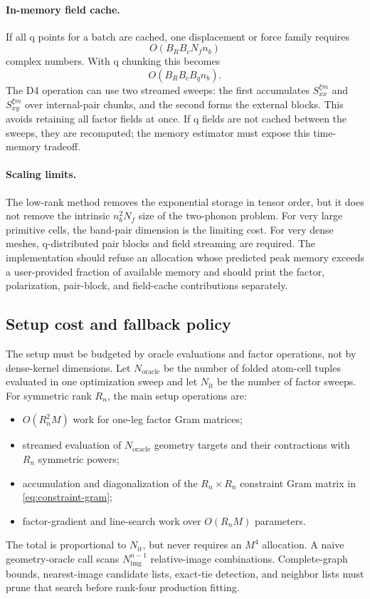 \documentclass{article}
\newcommand{\Nf}{N_f}
\begin{document}
\paragraph{In-memory field cache.}
If all q points for a batch are cached, one displacement or force family
requires
\begin{equation}
    O(B_RB_c\Nf n_b)
    \label{eq:full-field-cache}
\end{equation}
complex numbers. With q chunking this becomes
\begin{equation}
    O(B_RB_cB_qn_b).
    \label{eq:chunked-field-cache}
\end{equation}
The D4 operation can use two streamed sweeps: the first accumulates
$S_{xx}^{\xi m}$ and $S_{xy}^{\xi m}$ over internal-pair chunks, and the
second forms the external blocks. This avoids retaining all factor fields
at once. If q fields are not cached between the sweeps, they are recomputed;
the memory estimator must expose this time-memory tradeoff.

\paragraph{Scaling limits.}
The low-rank method removes the exponential storage in tensor order, but it
does not remove the intrinsic $n_b^2\Nf$ size of the two-phonon problem.
For very large primitive cells, the band-pair dimension is the limiting
cost. For very dense meshes, q-distributed pair blocks and field streaming
are required. The implementation should refuse an allocation whose
predicted peak memory exceeds a user-provided fraction of available memory
and should print the factor, polarization, pair-block, and field-cache
contributions separately.
\subsection{Setup cost and fallback policy}
\label{sec:setup-cost}

The setup must be budgeted by oracle evaluations and factor operations, not
by dense-kernel dimensions. Let $N_{\mathrm{oracle}}$ be the number of
folded atom-cell tuples evaluated in one optimization sweep and let
$N_{\mathrm{it}}$ be the number of factor sweeps. For symmetric rank $R_n$,
the main setup operations are:
\begin{itemize}
    \item $O(R_n^2M)$ work for one-leg factor Gram matrices;
    \item streamed evaluation of $N_{\mathrm{oracle}}$ geometry targets and
    their contractions with $R_n$ symmetric powers;
    \item accumulation and diagonalization of the
    $R_n\times R_n$ constraint Gram matrix in
    \autoref{eq:constraint-gram};
    \item factor-gradient and line-search work over $O(R_nM)$ parameters.
\end{itemize}
The total is proportional to $N_{\mathrm{it}}$, but never requires an
$M^4$ allocation. A naive geometry-oracle call scans
$N_{\mathrm{img}}^{n-1}$ relative-image combinations. Complete-graph bounds,
nearest-image candidate lists, exact-tie detection, and neighbor lists must
prune that search before rank-four production fitting.
\end{document}
